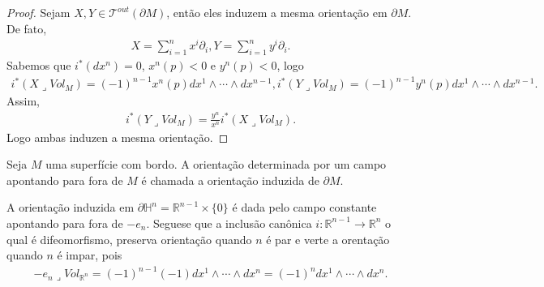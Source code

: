 \begin{proof}
  Sejam $X,Y\in \mathcal{T}^{out}(\partial M)$, então eles induzem a mesma orientação em $\partial M$.\\
  De fato,
  \begin{align*}
    X=\sum_{i=1}^{n}x^{i}\partial_i,
    Y=\sum_{i=1}^{n}y^{i}\partial_i.
  \end{align*}
  Sabemos que $i^{\ast}(dx^{n})=0$, $x^n(p)<0$ e $y^{n}(p)<0$, logo
  \begin{align*}
    i^{\ast}(X\lrcorner Vol_M)=(-1)^{n-1}x^{n}(p)dx^{1}\wedge\cdots\wedge dx^{n-1},
    i^{\ast}(Y\lrcorner Vol_M)=(-1)^{n-1}y^{n}(p)dx^{1}\wedge\cdots\wedge dx^{n-1}.
  \end{align*}
  Assim,
  \begin{align*}
    i^{\ast}(Y\lrcorner Vol_M)=\frac{y^{n}}{x^{n}}i^{\ast}(X\lrcorner Vol_M).
  \end{align*}
  Logo ambas induzen a mesma orientação.
\end{proof}
\begin{definition}
  Seja $M$ uma superfície com bordo. A orientação determinada por um campo apontando para fora de $M$ é chamada a orientação induzida de $\partial M$. 
\end{definition}
\begin{example}
  A orientação induzida em $\partial\mathbb{H}^{n}=\mathbb{R}^{n-1}\times\{0\}$ é dada pelo campo constante apontando para fora de $-e_n$. Seguese que a inclusão canônica $i:\mathbb{R}^{n-1}\to\mathbb{R}^{n}$ o qual é difeomorfismo, preserva orientação quando $n$ é par e verte a orentação quando $n$ é impar, pois
  \begin{align*}
    -e_n\lrcorner Vol_{\mathbb{R}^{n}}=(-1)^{n-1}(-1)dx^{1}\wedge\cdots\wedge dx^{n}=(-1)^{n}dx^1\wedge\cdots\wedge dx^n.
  \end{align*}
\end{example}
